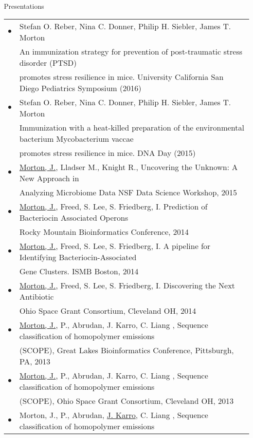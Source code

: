 \documentclass{resume} %
\begin{document}
\begin{rSection}{Presentations}
  \begin{tabular}{ll}
    $\bullet$ & Stefan O. Reber, Nina C. Donner, Philip H. Siebler, James T. Morton \\
               & An immunization strategy for prevention of post-traumatic stress disorder (PTSD)\\
               & promotes stress resilience in mice. University California San Diego Pediatrics Symposium  (2016) \\
    $\bullet$ & Stefan O. Reber, Nina C. Donner, Philip H. Siebler, James T. Morton \\
               & Immunization with a heat-killed preparation of the environmental bacterium Mycobacterium vaccae \\
               & promotes stress resilience in mice. DNA Day (2015)\\
    $\bullet$  & \underline{Morton, J.}, Lladser M., Knight R., Uncovering the Unknown: A New Approach in \\
               & Analyzing Microbiome Data NSF Data Science Workshop, 2015\\
    $\bullet$  & \underline{Morton, J.}, Freed, S. Lee, S. Friedberg, I. Prediction of Bacteriocin Associated Operons \\
               & Rocky Mountain Bioinformatics Conference, 2014\\
    $\bullet$  & \underline{Morton, J.}, Freed, S. Lee, S. Friedberg, I. A pipeline for Identifying Bacteriocin-Associated \\
               & Gene Clusters. ISMB Boston, 2014\\
    $\bullet$  & \underline{Morton, J.}, Freed, S. Lee, S. Friedberg, I. Discovering the Next Antibiotic \\
               & Ohio Space Grant Consortium, Cleveland OH, 2014 \\
    $\bullet$  & \underline{Morton, J.}, P., Abrudan, J. Karro, C. Liang , Sequence classification of homopolymer emissions \\
               & (SCOPE), Great Lakes Bioinformatics Conference, Pittsburgh, PA, 2013\\
    $\bullet$  & \underline{Morton, J.}, P., Abrudan, J. Karro, C. Liang , Sequence classification of homopolymer emissions \\
               & (SCOPE), Ohio Space Grant Consortium, Cleveland OH, 2013\\
    $\bullet$  & Morton, J., P., Abrudan, \underline{J. Karro}, C. Liang , Sequence classification of homopolymer emissions \\

\end{tabular}
\end{rSection}
\end{document}
